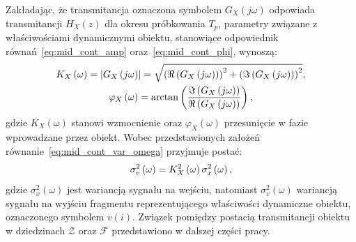 Zakładając, że transmitancja oznaczona symbolem $G_{X}(j\omega)$ odpowiada transmitancji $H_{X}(z)$ dla okresu próbkowania $T_{p}$, parametry związane z właściwościami dynamicznymi obiektu, stanowiące odpowiednik równań~\eqref{eq:mid_cont_amp} oraz~\eqref{eq:mid_cont_phi}, wynoszą:
\begin{gather}
K_{X} \left(\omega\right) = \left| G_{X} \left(j\omega\right) \right| = \sqrt{\left( \Re \left( G_{X} \left(j\omega\right) \right) \right)^{2} + \left( \Im \left( G_{X} \left(j\omega\right) \right) \right)^{2}} \label{eq:mid_disc_amp}, \\
\varphi_{X} \left(\omega\right) = \arctan \left( \frac{\Im \left( G_{X} \left(j\omega\right) \right)}{\Re \left( G_{X} \left(j\omega\right) \right)} \right) \label{eq:mid_disc_phi},
\end{gather}
gdzie $K_{X}(\omega)$ stanowi wzmocnienie oraz $\varphi_{X}(\omega)$ przesunięcie w fazie wprowadzane przez obiekt. Wobec przedstawionych założeń równanie~\eqref{eq:mid_cont_var_omega} przyjmuje postać:
\begin{equation}
\sigma_{v}^{2} \left(\omega\right) = K_{X}^{2} \left(\omega\right) \sigma_{x}^{2} \left(\omega\right) \label{eq:mid_disc_var_omega},
\end{equation}
gdzie $\sigma_{x}^{2}(\omega)$ jest wariancją sygnału na wejściu, natomiast $\sigma_{v}^{2}(\omega)$ wariancją sygnału na wyjściu fragmentu reprezentującego właściwości dynamiczne obiektu, oznaczonego symbolem $v(i)$. Związek pomiędzy postacią transmitancji obiektu w dziedzinach $\mathcal{Z}$ oraz $\mathcal{F}$ przedstawiono w dalszej części pracy.

